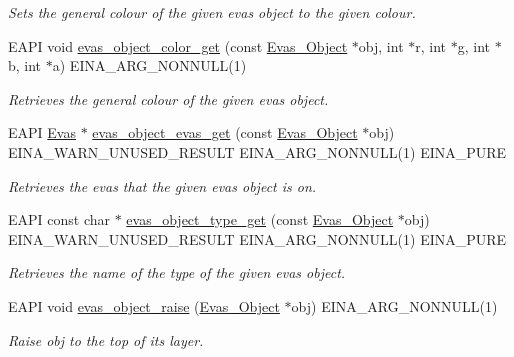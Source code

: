\begin{DoxyCompactItemize}
\begin{DoxyCompactList}\small\item\em Sets the general colour of the given evas object to the given colour. \item\end{DoxyCompactList}\item 
EAPI void \hyperlink{group__Evas__Object__Group__Basic_ga3856f8b88d158ffa9783b44340ef343d}{evas\_\-object\_\-color\_\-get} (const \hyperlink{group__Evas__Object__Group_ga9e19e6dd1f517a0ba437c0114d3e7c97}{Evas\_\-Object} $\ast$obj, int $\ast$r, int $\ast$g, int $\ast$b, int $\ast$a) EINA\_\-ARG\_\-NONNULL(1)
\begin{DoxyCompactList}\small\item\em Retrieves the general colour of the given evas object. \item\end{DoxyCompactList}\item 
EAPI \hyperlink{group__Evas__Canvas_ga5ff87cc4ce6bc43e3b640a6d37f73043}{Evas} $\ast$ \hyperlink{group__Evas__Object__Group__Basic_ga678e810edc3e2ee8b1080186bfa12247}{evas\_\-object\_\-evas\_\-get} (const \hyperlink{group__Evas__Object__Group_ga9e19e6dd1f517a0ba437c0114d3e7c97}{Evas\_\-Object} $\ast$obj) EINA\_\-WARN\_\-UNUSED\_\-RESULT EINA\_\-ARG\_\-NONNULL(1) EINA\_\-PURE
\begin{DoxyCompactList}\small\item\em Retrieves the evas that the given evas object is on. \item\end{DoxyCompactList}\item 
EAPI const char $\ast$ \hyperlink{group__Evas__Object__Group__Basic_gaebc12590e689bfcbfede10eca37f80ff}{evas\_\-object\_\-type\_\-get} (const \hyperlink{group__Evas__Object__Group_ga9e19e6dd1f517a0ba437c0114d3e7c97}{Evas\_\-Object} $\ast$obj) EINA\_\-WARN\_\-UNUSED\_\-RESULT EINA\_\-ARG\_\-NONNULL(1) EINA\_\-PURE
\begin{DoxyCompactList}\small\item\em Retrieves the name of the type of the given evas object. \item\end{DoxyCompactList}\item 
EAPI void \hyperlink{group__Evas__Object__Group__Basic_ga7a99128189105d042cf6b4fefca9b60e}{evas\_\-object\_\-raise} (\hyperlink{group__Evas__Object__Group_ga9e19e6dd1f517a0ba437c0114d3e7c97}{Evas\_\-Object} $\ast$obj) EINA\_\-ARG\_\-NONNULL(1)
\begin{DoxyCompactList}\small\item\em Raise {\ttfamily obj} to the top of its layer. \item\end{DoxyCompactList}\item 

\end{DoxyCompactItemize}

